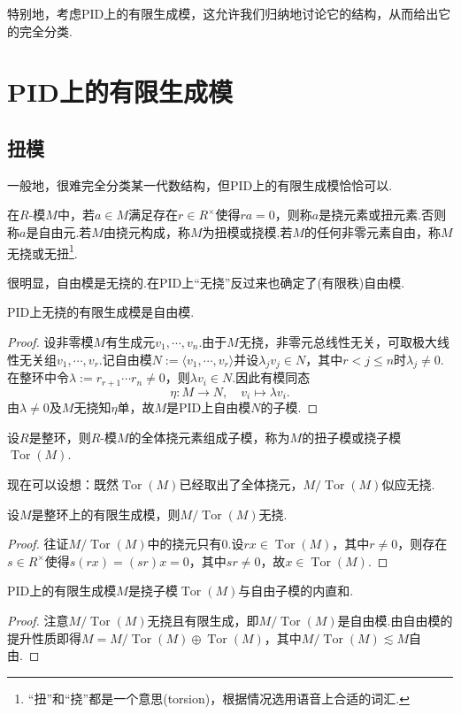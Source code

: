 特别地，考虑PID上的有限生成模，这允许我们归纳地讨论它的结构，从而给出它的完全分类.

\section{PID上的有限生成模}
\subsection{扭模}
一般地，很难完全分类某一代数结构，但PID上的有限生成模恰恰可以.
\begin{definition}
    在$R$-模$M$中，若$a\in M$满足存在$r\in R^\times$使得$ra=0$，则称$a$是{\heiti 挠元素}或{\heiti 扭元素}.否则称$a$是{\heiti 自由元}.若$M$由挠元构成，称$M$为{\heiti 扭模}或{\heiti 挠模}.若$M$的任何非零元素自由，称$M$ {\heiti 无挠}或{\heiti 无扭}\footnote{“扭”和“挠”都是一个意思(torsion)，根据情况选用语音上合适的词汇.}.
\end{definition}

很明显，自由模是无挠的.在PID上“无挠”反过来也确定了(有限秩)自由模.

\begin{thm}
    PID上无挠的有限生成模是自由模.
\end{thm}
\begin{proof}
    设非零模$M$有生成元$v_1,\cdots,v_n$.由于$M$无挠，非零元总线性无关，可取极大线性无关组$v_1,\cdots,v_r$.记自由模$N:=\langle v_1,\cdots,v_r\rangle $并设$\lambda_jv_j\in N$，其中$r<j\le n$时$\lambda_j\ne 0$.在整环中令$\lambda:=r_{r+1}\cdots r_n\ne 0$，则$\lambda v_i\in N$.因此有模同态
    \[
        \eta\colon M\to N,\quad v_i\mapsto\lambda v_i.
    \]
    由$\lambda\ne 0$及$M$无挠知$\eta$单，故$M$是PID上自由模$N$的子模.
\end{proof}

\begin{definition}
    设$R$是整环，则$R$-模$M$的全体挠元素组成子模，称为$M$的{\heiti 扭子模}或{\heiti 挠子模} $\operatorname*{Tor}(M)$.
\end{definition}

现在可以设想：既然$\operatorname*{Tor}(M)$已经取出了全体挠元，$M/\operatorname*{Tor}(M)$似应无挠.
\begin{prop}
    设$M$是整环上的有限生成模，则$M/\operatorname*{Tor}(M)$无挠.
\end{prop}
\begin{proof}
    往证$M/\operatorname*{Tor}(M)$中的挠元只有$0$.设$rx\in\operatorname*{Tor}(M)$，其中$r\ne 0$，则存在$s\in R^\times$使得$s(rx)=(sr)x=0$，其中$sr\ne 0$，故$x\in\operatorname*{Tor}(M)$.
\end{proof}
\begin{thm}
    PID上的有限生成模$M$是挠子模$\operatorname*{Tor}(M)$与自由子模的内直和.
\end{thm}
\begin{proof}
    注意$M/\operatorname*{Tor}(M)$无挠且有限生成，即$M/\operatorname*{Tor}(M)$是自由模.由自由模的提升性质即得$M=M/\operatorname*{Tor}(M)\oplus\operatorname*{Tor}(M)$，其中$M/\operatorname*{Tor}(M)\lesssim M$自由.
\end{proof}

